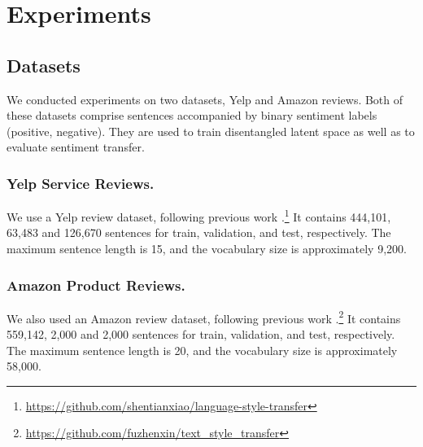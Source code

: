 \documentclass[letterpaper]{article} %
\begin{document}
\section{Experiments}

\subsection{Datasets}

We conducted experiments on two datasets, Yelp and Amazon reviews.
Both of these datasets comprise sentences accompanied by binary sentiment labels (positive, negative). They are used to train disentangled latent space as well as to evaluate sentiment transfer.

\subsubsection{Yelp Service Reviews.}
We use a Yelp review dataset, following previous work \cite{shen2017style,zhao2018adversarially}.\footnote{\url{https://github.com/shentianxiao/language-style-transfer}}
It contains 444,101, 63,483 and 126,670 sentences for train, validation, and test, respectively.
The maximum sentence length is 15, and the vocabulary size is approximately 9,200.

\subsubsection{Amazon Product Reviews.}
We also used an Amazon review dataset, following previous work \cite{fu2018style}.\footnote{\url{https://github.com/fuzhenxin/text_style_transfer}}
It contains 559,142, 2,000 and 2,000 sentences for train, validation, and test, respectively.
The maximum sentence length is 20, and the vocabulary size is approximately 58,000.
\end{document}
